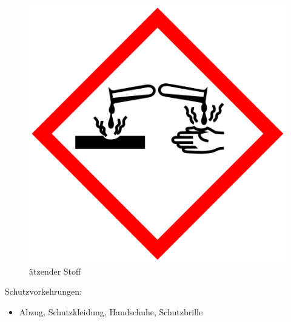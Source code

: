 \begin{figure}[h]
\begin{center}
\begin{minipage}[t]{0.4\textwidth}
\begin{center}
                \label{fig:cdbrandfoerdernd}
            \end{center}
        \end{minipage}
        \hspace{0.025\textwidth}
        \begin{minipage}[t]{0.4\textwidth}
            \begin{center}
                \includegraphics[height=0.1\textheight]{Bilder/Optische_Datentraeger_Die_Compact_Disc/Material_Polycarbonat/cdaetzwirkung.png}
                \caption[ätzender Stoff \newline \url{https://upload.wikimedia.org/wikipedia/commons/a/a1/GHS-pictogram-acid.svg} (zuletzt aufgerufen am 19.09.2015)]{ätzender Stoff}
                \label{fig:cdaetzwirkung}
            \end{center}
        \end{minipage}
    \end{center}
\end{figure}

Schutzvorkehrungen:
\begin{itemize}
    \item Abzug, Schutzkleidung, Handschuhe, Schutzbrille
\end{itemize}

